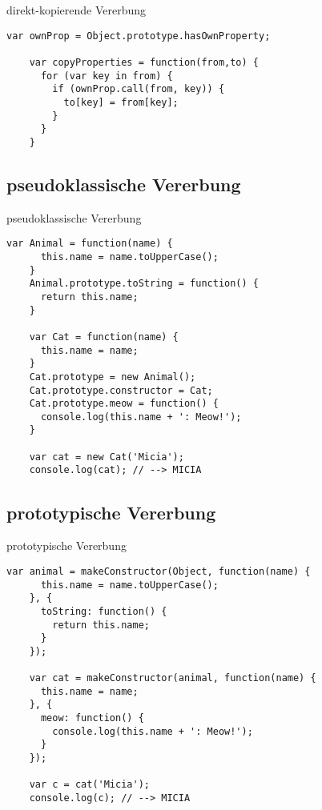 \begin{frame}[fragile]{direkt-kopierende Vererbung}
  \begin{lstlisting}[gobble=4]
    var ownProp = Object.prototype.hasOwnProperty;
  
    var copyProperties = function(from,to) {
      for (var key in from) {
        if (ownProp.call(from, key)) {
          to[key] = from[key];
        }
      }
    }
  \end{lstlisting}
\end{frame}

\subsection{pseudoklassische Vererbung}

\lstset{basicstyle=\ttfamily\scriptsize}

\begin{frame}[fragile]{pseudoklassische Vererbung}
  \begin{lstlisting}[gobble=4]
    var Animal = function(name) {
      this.name = name.toUpperCase();
    }
    Animal.prototype.toString = function() {
      return this.name;
    }
    
    var Cat = function(name) {
      this.name = name;
    }
    Cat.prototype = new Animal();
    Cat.prototype.constructor = Cat;
    Cat.prototype.meow = function() {
      console.log(this.name + ': Meow!');
    }
    
    var cat = new Cat('Micia');
    console.log(cat); // --> MICIA
  \end{lstlisting}
\end{frame}

\subsection{prototypische Vererbung}

\begin{frame}[fragile]{prototypische Vererbung}
  \begin{lstlisting}[gobble=4]
    var animal = makeConstructor(Object, function(name) {
      this.name = name.toUpperCase();
    }, {
      toString: function() {
        return this.name;
      }
    });
    
    var cat = makeConstructor(animal, function(name) {
      this.name = name;
    }, {
      meow: function() {
        console.log(this.name + ': Meow!');
      }
    });
    
    var c = cat('Micia');
    console.log(c); // --> MICIA
  \end{lstlisting}
\end{frame}

